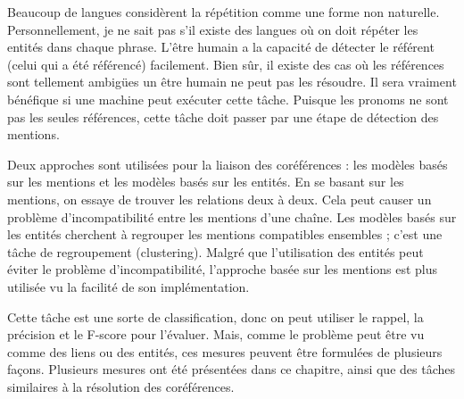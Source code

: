 \documentclass{KodeBook}
\begin{document}
\begin{discussion}
Beaucoup de langues considèrent la répétition comme une forme non naturelle. 
Personnellement, je ne sait pas s'il existe des langues où on doit répéter les entités dans chaque phrase. 
L'être humain a la capacité de détecter le référent (celui qui a été référencé) facilement. 
Bien sûr, il existe des cas où les références sont tellement ambigües un être humain ne peut pas les résoudre. 
Il sera vraiment bénéfique si une machine peut exécuter cette tâche. 
Puisque les pronoms ne sont pas les seules références, cette tâche doit passer par une étape de détection des mentions. 

Deux approches sont utilisées pour la liaison des coréférences : les modèles basés sur les mentions et les modèles basés sur les entités. 
En se basant sur les mentions, on essaye de trouver les relations deux à deux.
Cela peut causer un problème d'incompatibilité entre les mentions d'une chaîne. 
Les modèles basés sur les entités cherchent à regrouper les mentions compatibles ensembles ; c'est une tâche de regroupement (clustering). 
Malgré que l'utilisation des entités peut éviter le problème d'incompatibilité, l'approche basée sur les mentions est plus utilisée vu la facilité de son implémentation. 

Cette tâche est une sorte de classification, donc on peut utiliser le rappel, la précision et le F-score pour l'évaluer. 
Mais, comme le problème peut être vu comme des liens ou des entités, ces mesures peuvent être formulées de plusieurs façons. 
Plusieurs mesures ont été présentées dans ce chapitre, ainsi que des tâches similaires à la  résolution des coréférences.
\end{discussion}

\ifx\wholebook\relax\else
% 
% 
	
\end{document}
